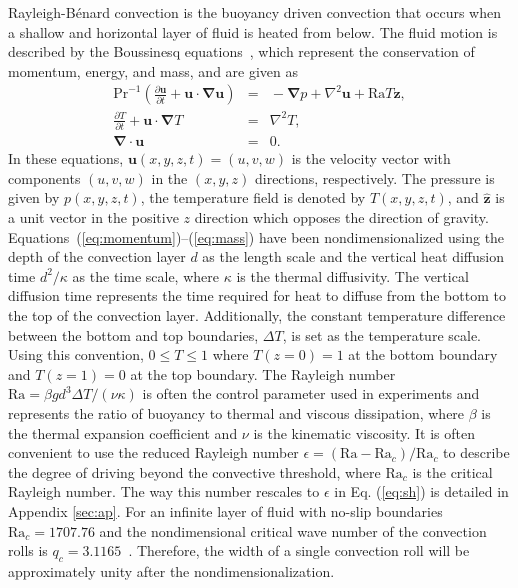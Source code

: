 \documentclass[preprint,prx,floatfix]{revtex4-1}
\begin{document}
Rayleigh-B\'enard convection is the buoyancy driven convection that occurs when a shallow and horizontal layer of fluid is heated from below. The fluid motion is described by the Boussinesq equations~\cite{re:cross93}, which represent the conservation of momentum, energy, and mass, and are given as 
\begin{eqnarray}
\text{Pr}^{-1} \! \left( \frac{\partial \mathbf u}{\partial t} \!+\! \mathbf u \cdot \bm{\nabla} \mathbf u \right )\! &=&\! - \bm{\nabla} p \!+\! \nabla^2 \mathbf u \!+\! \text{Ra} T \hat{\mathbf{z}}, \label{eq:momentum} \\
\frac{\partial T}{\partial t} + \mathbf{u} \cdot \bm{\nabla} T &=& \nabla^2 T, \label{eq:energy} \\
\bm{\nabla} \cdot \mathbf{u} &=& 0. \label{eq:mass}
\end{eqnarray}
In these equations, $\mathbf{u}(x,y,z,t) = (u,v,w)$ is the velocity vector with components $(u,v,w)$ in the $(x,y,z)$ directions, respectively. The pressure is given by $p(x,y,z,t)$, the temperature field is denoted by $T(x,y,z,t)$, and $\hat{\mathbf{z}}$ is a unit vector in the positive $z$ direction which opposes the direction of gravity. Equations~(\ref{eq:momentum})--(\ref{eq:mass}) have been nondimensionalized using the depth of the convection layer $d$ as the length scale and the vertical heat diffusion time $d^2/ \kappa$ as the time scale, where $\kappa$ is the thermal diffusivity.  The vertical diffusion time represents the time required for heat to diffuse from the bottom to the top of the convection layer. Additionally, the constant temperature difference between the bottom and top boundaries, $\Delta T$, is set as the temperature scale. Using this convention, $0 \leq T \leq 1$ where $T(z\!=\!0)\!=\!1$ at the bottom boundary and $T(z\!=\!1)\!=\!0$ at the top boundary. 
The Rayleigh number $\text{Ra} \!=\!\beta g d^3 \Delta T/(\nu \kappa)$ is often the control parameter used in experiments and represents the ratio of buoyancy to thermal and viscous dissipation, where $\beta$ is the thermal expansion coefficient and $\nu$ is the kinematic viscosity. It is often convenient to use the reduced Rayleigh number $\epsilon = (\text{Ra}-\text{Ra}_c)/\text{Ra}_c$ to describe the degree of driving beyond the convective threshold, where $\text{Ra}_c$ is the critical Rayleigh number. The way this number rescales to $\epsilon$ in Eq. (\ref{eq:sh}) is detailed in Appendix \ref{sec:ap}. For an infinite layer of fluid with no-slip boundaries $\text{Ra}_c=1707.76$ and the nondimensional critical wave number of the convection rolls is $q_c=3.1165$~\cite{re:cross93}.  Therefore, the width of a single convection roll will be approximately unity after the nondimensionalization.
\end{document}

